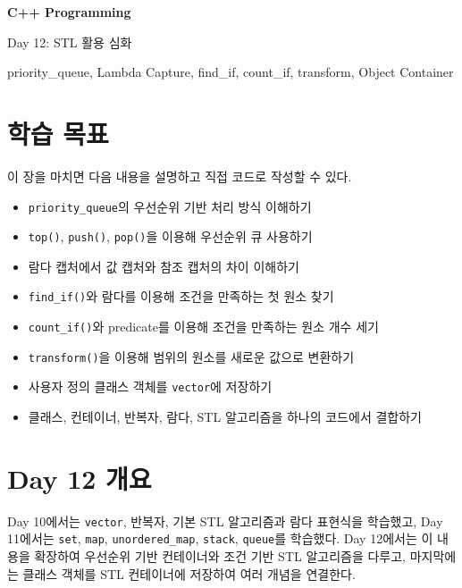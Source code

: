 \documentclass[11pt,a4paper]{article}
\begin{document}
\begin{titlepage}
    \centering
    \vspace*{3cm}
    {\Huge\bfseries C++ Programming\par}
    \vspace{0.8cm}
    {\LARGE Day 12: STL 활용 심화\par}
    \vspace{2cm}
    {\large priority\_queue, Lambda Capture, find\_if, count\_if, transform, Object Container\par}
    \vfill
\end{titlepage}

\tableofcontents
\newpage

\section{학습 목표}
\begin{learningbox}
이 장을 마치면 다음 내용을 설명하고 직접 코드로 작성할 수 있다.
\begin{itemize}[leftmargin=1.5em]
    \item \texttt{priority\_queue}의 우선순위 기반 처리 방식 이해하기
    \item \texttt{top()}, \texttt{push()}, \texttt{pop()}을 이용해 우선순위 큐 사용하기
    \item 람다 캡처에서 값 캡처와 참조 캡처의 차이 이해하기
    \item \texttt{find\_if()}와 람다를 이용해 조건을 만족하는 첫 원소 찾기
    \item \texttt{count\_if()}와 predicate를 이용해 조건을 만족하는 원소 개수 세기
    \item \texttt{transform()}을 이용해 범위의 원소를 새로운 값으로 변환하기
    \item 사용자 정의 클래스 객체를 \texttt{vector}에 저장하기
    \item 클래스, 컨테이너, 반복자, 람다, STL 알고리즘을 하나의 코드에서 결합하기
\end{itemize}
\end{learningbox}

\section{Day 12 개요}
Day 10에서는 \texttt{vector}, 반복자, 기본 STL 알고리즘과 람다 표현식을 학습했고,
Day 11에서는 \texttt{set}, \texttt{map}, \texttt{unordered\_map},
\texttt{stack}, \texttt{queue}를 학습했다.
Day 12에서는 이 내용을 확장하여 우선순위 기반 컨테이너와 조건 기반 STL 알고리즘을 다루고,
마지막에는 클래스 객체를 STL 컨테이너에 저장하여 여러 개념을 연결한다.
\end{document}
